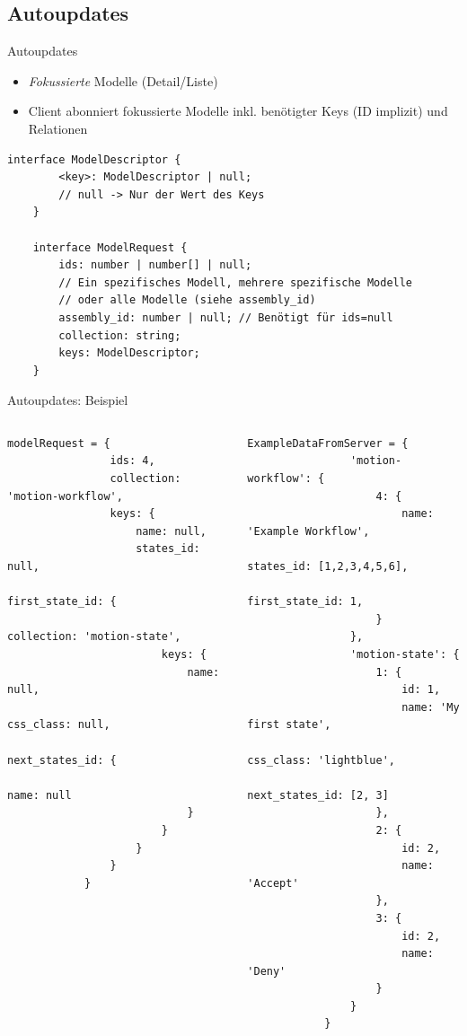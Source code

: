 \documentclass[10pt]{beamer}
\begin{document}
\subsection{Autoupdates}
\begin{frame}[fragile]{Autoupdates}
	\begin{itemize}
		\item \textit{Fokussierte} Modelle (Detail/Liste)
		\item Client abonniert fokussierte Modelle inkl. benötigter Keys (ID implizit) und Relationen
	\end{itemize}
	\begin{Verbatim}[tabsize=2]
	interface ModelDescriptor {
		<key>: ModelDescriptor | null;
		// null -> Nur der Wert des Keys
	}
	
	interface ModelRequest {
		ids: number | number[] | null;
		// Ein spezifisches Modell, mehrere spezifische Modelle
		// oder alle Modelle (siehe assembly_id)
		assembly_id: number | null; // Benötigt für ids=null
		collection: string;
		keys: ModelDescriptor;
	}
	\end{Verbatim}
\end{frame}
\begin{frame}[fragile]{Autoupdates: Beispiel}
	\footnotesize
	\begin{columns}
		\begin{column}{0.48\textwidth}
			\begin{Verbatim}[tabsize=2]
			modelRequest = {
				ids: 4,
				collection: 'motion-workflow',
				keys: {
					name: null,
					states_id: null,
					first_state_id: {
						collection: 'motion-state',
						keys: {
							name: null,
							css_class: null,
							next_states_id: {
								name: null
							}
						}
					}
				}
			}
			\end{Verbatim}
		\end{column}
		\begin{column}{0.48\textwidth}  %
			\begin{Verbatim}[tabsize=2]
			ExampleDataFromServer = {
				'motion-workflow': {
					4: {
						name: 'Example Workflow',
						states_id: [1,2,3,4,5,6],
						first_state_id: 1,
					}
				},
				'motion-state': {
					1: {
						id: 1,
						name: 'My first state',
						css_class: 'lightblue',
						next_states_id: [2, 3]
					},
					2: {
						id: 2,
						name: 'Accept'
					},
					3: {
						id: 2,
						name: 'Deny'
					}
				}
			}
			\end{Verbatim}
		\end{column}
	\end{columns}
\end{frame}
\end{document}
